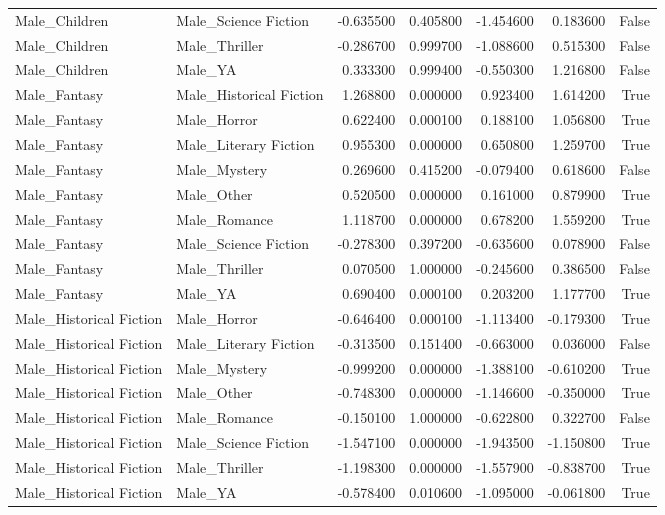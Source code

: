\begin{tabular}{llrrrrr}
Male_Children & Male_Science Fiction & -0.635500 & 0.405800 & -1.454600 & 0.183600 & False \\
Male_Children & Male_Thriller & -0.286700 & 0.999700 & -1.088600 & 0.515300 & False \\
Male_Children & Male_YA & 0.333300 & 0.999400 & -0.550300 & 1.216800 & False \\
Male_Fantasy & Male_Historical Fiction & 1.268800 & 0.000000 & 0.923400 & 1.614200 & True \\
Male_Fantasy & Male_Horror & 0.622400 & 0.000100 & 0.188100 & 1.056800 & True \\
Male_Fantasy & Male_Literary Fiction & 0.955300 & 0.000000 & 0.650800 & 1.259700 & True \\
Male_Fantasy & Male_Mystery & 0.269600 & 0.415200 & -0.079400 & 0.618600 & False \\
Male_Fantasy & Male_Other & 0.520500 & 0.000000 & 0.161000 & 0.879900 & True \\
Male_Fantasy & Male_Romance & 1.118700 & 0.000000 & 0.678200 & 1.559200 & True \\
Male_Fantasy & Male_Science Fiction & -0.278300 & 0.397200 & -0.635600 & 0.078900 & False \\
Male_Fantasy & Male_Thriller & 0.070500 & 1.000000 & -0.245600 & 0.386500 & False \\
Male_Fantasy & Male_YA & 0.690400 & 0.000100 & 0.203200 & 1.177700 & True \\
Male_Historical Fiction & Male_Horror & -0.646400 & 0.000100 & -1.113400 & -0.179300 & True \\
Male_Historical Fiction & Male_Literary Fiction & -0.313500 & 0.151400 & -0.663000 & 0.036000 & False \\
Male_Historical Fiction & Male_Mystery & -0.999200 & 0.000000 & -1.388100 & -0.610200 & True \\
Male_Historical Fiction & Male_Other & -0.748300 & 0.000000 & -1.146600 & -0.350000 & True \\
Male_Historical Fiction & Male_Romance & -0.150100 & 1.000000 & -0.622800 & 0.322700 & False \\
Male_Historical Fiction & Male_Science Fiction & -1.547100 & 0.000000 & -1.943500 & -1.150800 & True \\
Male_Historical Fiction & Male_Thriller & -1.198300 & 0.000000 & -1.557900 & -0.838700 & True \\
Male_Historical Fiction & Male_YA & -0.578400 & 0.010600 & -1.095000 & -0.061800 & True \\

\end{tabular}

